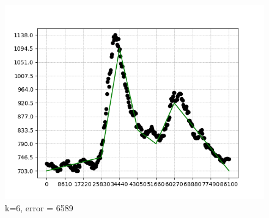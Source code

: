 \documentclass{article}
\begin{document}
\begin{figure}[h!]
\begin{minipage}{.3\textwidth}
            \includegraphics[width=.9\linewidth]{graficos/solution_11x11,6N_optimistic_instance.png}
            \caption{k=6, error = 6589}
          \end{minipage}%
          
    \end{figure}
\end{document}
